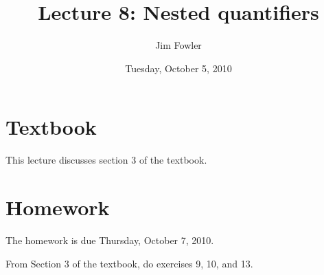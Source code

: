 \documentclass[12pt]{handout}
\title{Lecture 8: Nested quantifiers}
\author{Jim Fowler}
\date{Tuesday, October  5, 2010}
\begin{document}
\maketitle

\section*{Textbook}

This lecture discusses section 3 of the textbook.


\section*{Homework} 





The homework is due Thursday, October  7, 2010.






From Section 3 of the textbook, do exercises 9, 10, and 13.
\end{document}
